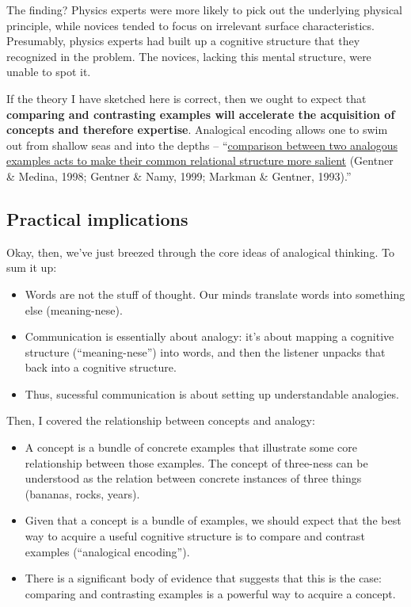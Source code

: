 The finding? Physics experts were more likely to pick out the underlying
physical principle, while novices tended to focus on irrelevant surface
characteristics. Presumably, physics experts had built up a cognitive
structure that they recognized in the problem. The novices, lacking this
mental structure, were unable to spot it.

If the theory I have sketched here is correct, then we ought to expect
that \textbf{comparing and contrasting examples will accelerate the
acquisition of concepts and therefore expertise}. Analogical encoding
allows one to swim out from shallow seas and into the depths --
``\href{http://onlinelibrary.wiley.com/doi/10.1111/j.1551-6709.2009.01070.x/full}{comparison
between two analogous examples acts to make their common relational
structure more salient} (Gentner \& Medina, 1998; Gentner \& Namy, 1999;
Markman \& Gentner, 1993).''

\subsection{Practical implications}\label{practical-implications}

Okay, then, we've just breezed through the core ideas of analogical
thinking. To sum it up:

\begin{itemize}
\itemsep1pt\parskip0pt
\item
  Words are not the stuff of thought. Our minds translate words into
  something else (meaning-nese).
\item
  Communication is essentially about analogy: it's about mapping a
  cognitive structure (``meaning-nese'') into words, and then the
  listener unpacks that back into a cognitive structure.
\item
  Thus, sucessful communication is about setting up understandable
  analogies.
\end{itemize}

Then, I covered the relationship between concepts and analogy:

\begin{itemize}
\itemsep1pt\parskip0pt
\item
  A concept is a bundle of concrete examples that illustrate some core
  relationship between those examples. The concept of three-ness can be
  understood as the relation between concrete instances of three things
  (bananas, rocks, years).
\item
  Given that a concept is a bundle of examples, we should expect that
  the best way to acquire a useful cognitive structure is to compare and
  contrast examples (``analogical encoding'').
\item
  There is a significant body of evidence that suggests that this is the
  case: comparing and contrasting examples is a powerful way to acquire
  a concept.
\end{itemize}

